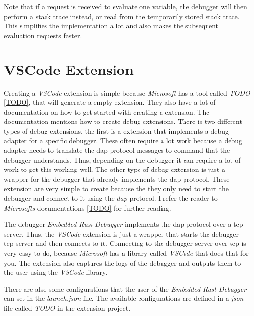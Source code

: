 Note that if a request is received to evaluate one variable, the debugger will then perform a stack trace instead, or read from the temporarily stored stack trace.
This simplifies the implementation a lot and also makes the subsequent evaluation requests faster.


\section{VSCode Extension}
Creating a \emph{VSCode} extension is simple because \emph{Microsoft} has a tool called \emph{TODO} \ref{TODO}, that will generate a empty extension.
They also have a lot of documentation on how to get started with creating a extension.
The documentation mentions how to create debug extensions.
There is two different types of debug extensions, the first is a extension that implements a debug adapter for a specific debugger.
These often require a lot work because a debug adapter needs to translate the \gls{dap} protocol messages to command that the debugger understands.
Thus, depending on the debugger it can require a lot of work to get this working well.
The other type of debug extension is just a wrapper for the debugger that already implements the \gls{dap} protocol.
These extension are very simple to create because the they only need to start the debugger and connect to it using the \emph{dap} protocol.
I refer the reader to \emph{Microsofts} documentations \ref{TODO} for further reading.

The debugger \emph{Embedded Rust Debugger} implements the \gls{dap} protocol over a \gls{tcp} server.
Thus, the \emph{VSCode} extension is just a wrapper that starts the debugger \gls{tcp} server and then connects to it.
Connecting to the debugger server over \gls{tcp} is very easy to do, because \emph{Microsoft} has a library called \emph{VSCode} that does that for you.
The extension also captures the logs of the debugger and outputs them to the user using the \emph{VSCode} library.

There are also some configurations that the user of the \emph{Embedded Rust Debugger} can set in the \emph{launch.json} file.
The available configurations are defined in a \emph{json} file called \emph{TODO} in the extension project.
